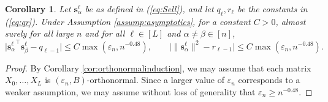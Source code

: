 \documentclass{article}
\newtheorem{corollary}[theorem]{Corollary}
\theoremstyle{definition}
\newcommand{\s}{\mathbf{s}}
\renewcommand{\a}{\alpha}
\renewcommand{\b}{\beta}
\newcommand{\eps}{\varepsilon}
\newcommand{\1}{\mathbf{1}}
\begin{document}
\begin{corollary}\label{cor:Sapprox}
Let $\s_\a^\ell$ be as defined in (\ref{eq:Sell}), and let
$q_\ell,r_\ell$ be the constants in (\ref{eq:qr}).
Under Assumption \ref{assump:asymptotics}, for a constant
$C>0$, almost surely for all large $n$ and for all $\ell \in [L]$ and $\a \neq
\b \in [n]$,
\begin{equation}\label{eq:Sabbound}
\Big|{\s_\a^\ell}^\top \s_\b^\ell-q_{\ell-1}\Big| \leq C\max(\eps_n,n^{-0.48}),
\qquad \Big|\|\s_\a^\ell\|^2-r_{\ell-1}\Big| \leq C\max(\eps_n,n^{-0.48}).
\end{equation}
\end{corollary}
\begin{proof}
By Corollary \ref{cor:orthonormalinduction}, we may assume that each matrix
$X_0,\ldots,X_L$ is $(\eps_n,B)$-orthonormal. Since a larger value of $\eps_n$
corresponds to a weaker assumption, we may assume without loss of generality
that $\eps_n \geq n^{-0.48}$.


\end{proof}
\end{document}
